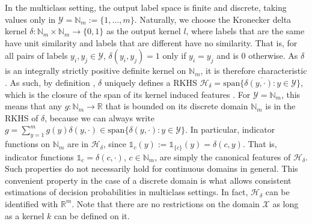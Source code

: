 \documentclass[twoside]{article}
\begin{document}
		In the multiclass setting, the output label space is finite and discrete, taking values only in $\mathcal{Y} = \mathbb{N}_{m} := \{1, \dots, m\}$. Naturally, we choose the Kronecker delta kernel $\delta : \mathbb{N}_{m} \times \mathbb{N}_{m} \to \{0, 1\}$ as the output kernel $l$, where labels that are the same have unit similarity and labels that are different have no similarity. That is, for all pairs of labels $y_{i}, y_{j} \in \mathcal{Y}$, $\delta(y_{i}, y_{j}) = 1$ only if $y_{i} = y_{j}$ and is $0$ otherwise. As $\delta$ is an integrally strictly positive definite kernel on $\mathbb{N}_{m}$, it is therefore characteristic \citep[Theorem 7]{sriperumbudur2010hilbert}. As such, by definition \citep{fukumizu2004dimensionality}, $\delta$ uniquely defines a \gls{RKHS}  $\mathcal{H}_{\delta} = \overline{\mathrm{span}\{\delta(y, \cdot) : y \in \mathcal{Y}\}}$, which is the closure of the span of its kernel induced features \citep{xu2009refinement}. For $\mathcal{Y} = \mathbb{N}_{m}$, this means that any $g : \mathbb{N}_{m} \to \mathbb{R}$ that is bounded on its discrete domain $\mathbb{N}_{m}$ is in the \gls{RKHS} of $\delta$, because we can always write $g = \sum_{y = 1}^{m} g(y) \delta(y, \cdot) \in \mathrm{span}\{\delta(y, \cdot) : y \in \mathcal{Y}\}$. In particular, indicator functions on $\mathbb{N}_{m}$ are in $\mathcal{H}_{\delta}$, since $\mathbb{1}_{c}(y) := \mathbb{1}_{\{c\}}(y) = \delta(c, y)$.
		That is, indicator functions $\mathbb{1}_{c} = \delta(c, \cdot)$, $c \in \mathbb{N}_{m}$, are simply the canonical features of $\mathcal{H}_{\delta}$. Such properties do not necessarily hold for continuous domains in general. This convenient property in the case of a discrete domain is what allows consistent estimations of decision probabilities in multiclass settings. In fact, $\mathcal{H}_{\delta}$ can be identified with $\mathbb{R}^{m}$. Note that there are no restrictions on the domain $\mathcal{X}$ as long as a kernel $k$ can be defined on it.
		
\end{document}
